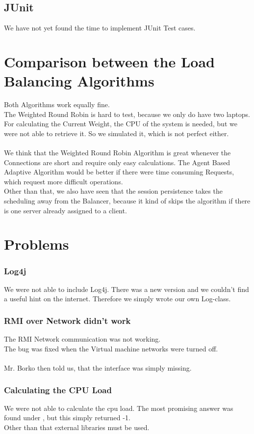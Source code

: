 \documentclass[12pt]{article}
\begin{document}
\subsection{JUnit}
We have not yet found the time to implement JUnit Test cases.
\section{Comparison between the Load Balancing Algorithms}
Both Algorithms work equally fine. \\
The Weighted Round Robin is hard to test, because we only do have two laptops.
For calculating the Current Weight, the CPU of the system is needed, but we were not able to retrieve it.
So we simulated it, which is not perfect either.
\\ \\
We think that the Weighted Round Robin Algorithm is great whenever the Connections are short and require only easy calculations. The Agent Based Adaptive Algorithm would be better if there were time consuming Requests, which request more difficult operations. \\
Other than that, we also have seen that the session persistence takes the scheduling away from the Balancer, because it kind of skips the algorithm if there is one server already assigned to a client.
\section{Problems}
\subsubsection{Log4j}
We were not able to include Log4j. There was a new version and we couldn't find a useful hint on the internet.
Therefore we simply wrote our own Log-class.
\subsubsection{RMI over Network didn't work}
The RMI Network communication was not working. \\
The bug was fixed when the Virtual machine networks were turned off. \\ \\
Mr. Borko then told us, that the interface was simply missing.
\subsubsection{Calculating the CPU Load}
We were not able to calculate the cpu load. The most promising answer was found under \cite{cpuload}, but this simply returned -1. \\
Other than that external libraries must be used.
\end{document}
